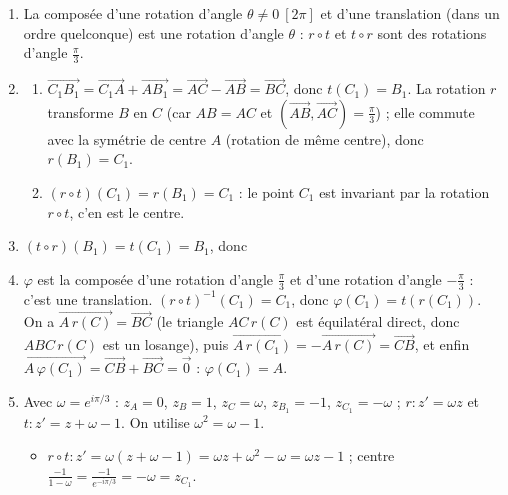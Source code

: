 \begin{corrige}
\begin{sol}
\begin{enumerate}
      \item La composée d'une rotation d'angle $\theta \neq 0\ [2\pi]$ et d'une translation (dans un ordre quelconque) est une rotation d'angle $\theta$ :
            $r \circ t$ et $t \circ r$ sont des rotations d'angle $\frac{\pi}{3}$.
      \item \begin{enumerate}
                  \item $\overrightarrow{C_1B_1} = \overrightarrow{C_1A} + \overrightarrow{AB_1} = \overrightarrow{AC} - \overrightarrow{AB} = \overrightarrow{BC}$,
                        donc $t(C_1) = B_1$.
                        La rotation $r$ transforme $B$ en $C$ (car $AB = AC$ et $(\overrightarrow{AB},\overrightarrow{AC}) = \frac{\pi}{3}$) ;
                        elle commute avec la symétrie de centre $A$ (rotation de même centre), donc $r(B_1) = C_1$.
                  \item $(r \circ t)(C_1) = r(B_1) = C_1$ : le point $C_1$ est invariant par la rotation $r \circ t$, c'en est le centre.
            \end{enumerate}
      \item $(t \circ r)(B_1) = t(C_1) = B_1$, donc 
      \item $\varphi$ est la composée d'une rotation d'angle $\frac{\pi}{3}$ et d'une rotation d'angle $-\frac{\pi}{3}$ : c'est une translation.
            $(r \circ t)^{-1}(C_1) = C_1$, donc $\varphi(C_1) = t(r(C_1))$.
            On a $\overrightarrow{A\,r(C)} = \overrightarrow{BC}$ (le triangle $AC\,r(C)$ est équilatéral direct, donc $ABC\,r(C)$ est un losange), puis
            $\overrightarrow{A\,r(C_1)} = -\overrightarrow{A\,r(C)} = \overrightarrow{CB}$, et enfin
            $\overrightarrow{A\,\varphi(C_1)} = \overrightarrow{CB} + \overrightarrow{BC} = \vec{0}$ : $\varphi(C_1) = A$.
      \item Avec $\omega = e^{i\pi/3}$ : $z_A = 0$, $z_B = 1$, $z_C = \omega$, $z_{B_1} = -1$, $z_{C_1} = -\omega$ ;
            $r : z' = \omega z$ et $t : z' = z + \omega - 1$. On utilise $\omega^2 = \omega - 1$.
            \begin{itemize}
                  \item $r \circ t : z' = \omega(z + \omega - 1) = \omega z + \omega^2 - \omega = \omega z - 1$ ; centre $\frac{-1}{1-\omega} = \frac{-1}{e^{-i\pi/3}} = -\omega = z_{C_1}$.

\end{itemize}
\end{enumerate}
\end{sol}
\end{corrige}
